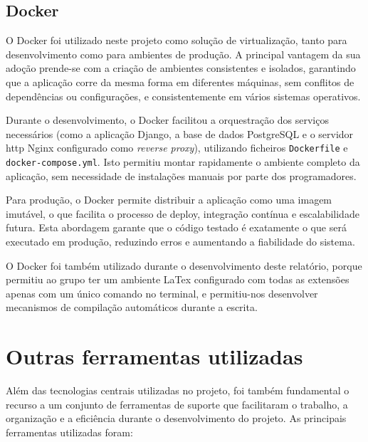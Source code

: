 \subsection{Docker}

O Docker foi utilizado neste projeto como solução de virtualização, tanto para desenvolvimento como para ambientes de produção. A principal vantagem da sua adoção prende-se com a criação de ambientes consistentes e isolados, garantindo que a aplicação corre da mesma forma em diferentes máquinas, sem conflitos de dependências ou configurações, e consistentemente em vários sistemas operativos.

Durante o desenvolvimento, o Docker facilitou a orquestração dos serviços necessários (como a aplicação Django, a base de dados PostgreSQL e o servidor \gls{http} Nginx configurado como \textit{reverse proxy}), utilizando ficheiros \texttt{Dockerfile} e \texttt{docker-compose.yml}. Isto permitiu montar rapidamente o ambiente completo da aplicação, sem necessidade de instalações manuais por parte dos programadores.

Para produção, o Docker permite distribuir a aplicação como uma imagem imutável, o que facilita o processo de deploy, integração contínua e escalabilidade futura. Esta abordagem garante que o código testado é exatamente o que será executado em produção, reduzindo erros e aumentando a fiabilidade do sistema.

O Docker foi também utilizado durante o desenvolvimento deste relatório, porque permitiu ao grupo ter um ambiente LaTex configurado com todas as extensões apenas com um único comando no terminal, e permitiu-nos desenvolver mecanismos de compilação automáticos durante a escrita. 


\section{Outras ferramentas utilizadas}
\label{sec:tools}

Além das tecnologias centrais utilizadas no projeto, foi também fundamental o recurso a um conjunto de ferramentas de suporte que facilitaram o trabalho, a organização e a eficiência durante o desenvolvimento do projeto. As principais ferramentas utilizadas foram:

